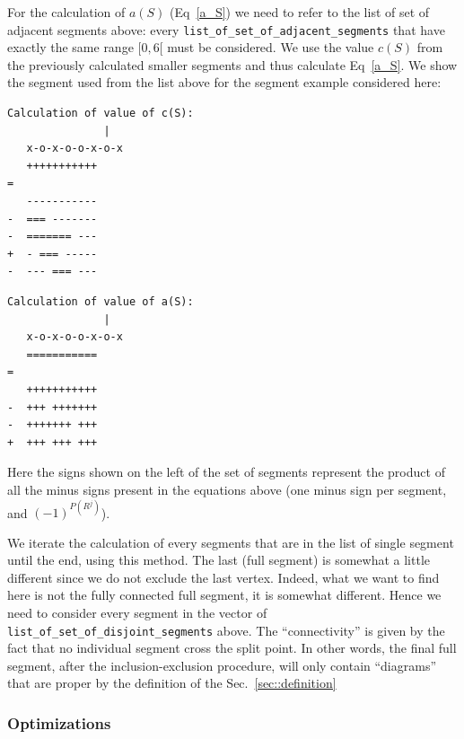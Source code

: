 \documentclass[10pt,letter]{article}
\begin{document}
For the calculation of $a(S)$ (Eq~\eqref{a_S}) we need to refer to the list of set of adjacent segments above: every \Verb#list_of_set_of_adjacent_segments# that have exactly the same range $[0,6[$ must be considered. We use the value $c(S)$ from the previously calculated smaller segments and thus calculate Eq~\eqref{a_S}. We show the segment used from the list above for the segment example considered here:

\noindent\begin{minipage}[t]{.5\textwidth}
\begin{bashInput3}
\begin{lstlisting}[style=BashInputStyle]
Calculation of value of c(S):
               |    
   x-o-x-o-o-x-o-x
   +++++++++++
=
   -----------
-  === -------
-  ======= ---
+  - === -----
-  --- === ---
\end{lstlisting}   
\end{bashInput3}
\end{minipage}\hfill
\begin{minipage}[t]{.5\textwidth}
\begin{bashInput3}
\begin{lstlisting}[style=BashInputStyle]
Calculation of value of a(S):
               |    
   x-o-x-o-o-x-o-x
   =========== 
=
   +++++++++++
-  +++ +++++++
-  +++++++ +++
+  +++ +++ +++
\end{lstlisting}   
\end{bashInput3}
\end{minipage}

Here the signs shown on the left of the set of segments represent the product of all the minus signs present in the equations above (one minus sign per segment, and $ (-1)^{P(R^j)}$). 

We iterate the calculation of every segments that are in the list of single segment until the end, using this method. The last (full segment) is somewhat a little different since we do not exclude the last vertex. Indeed, what we want to find here is not the fully connected full segment, it is somewhat different. Hence we need to consider every segment in the vector of \Verb#list_of_set_of_disjoint_segments# above. The ``connectivity'' is given by the fact that no individual segment cross the split point. In other words, the final full segment, after the inclusion-exclusion procedure, will only contain ``diagrams'' that are proper by the definition of the Sec.~\ref{sec::definition}

\subsubsection{Optimizations}
\end{document}
